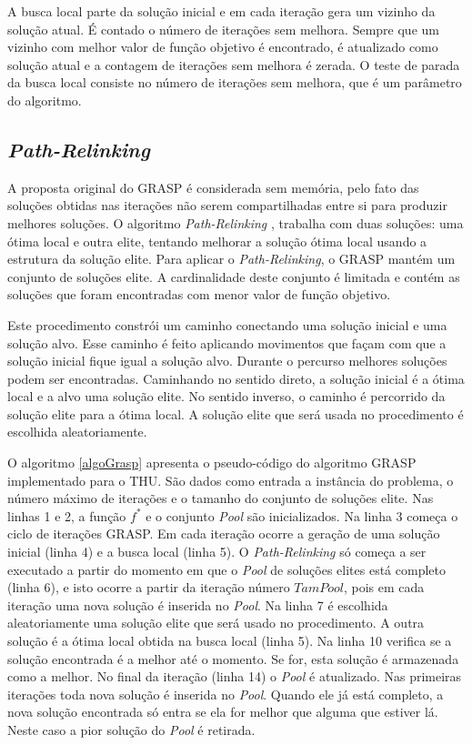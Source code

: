 \documentclass[11pt]{article}
\begin{document}
A busca local parte da solução inicial e em cada iteração gera um vizinho da solução atual. É contado o número de iterações sem melhora. Sempre que um vizinho com melhor valor de função objetivo é encontrado, é atualizado como solução atual e a contagem de iterações sem melhora é zerada. O teste de parada da busca local consiste no número de iterações sem melhora, que é um parâmetro do algoritmo. 

\subsection{\textit{Path-Relinking}}

A proposta original do GRASP é considerada sem memória, pelo fato das soluções obtidas nas iterações não serem compartilhadas entre si para produzir melhores soluções. O algoritmo \textit{Path-Relinking} \cite{Glover96tabusearch}, \cite{pathRelinking} trabalha com duas soluções: uma ótima local e outra elite, tentando melhorar a solução ótima local usando a estrutura da solução elite. Para aplicar o \textit{Path-Relinking}, o GRASP mantém um conjunto de soluções elite. A cardinalidade deste conjunto é limitada e contém as soluções que foram encontradas com menor valor de função objetivo.

Este procedimento constrói um caminho conectando uma solução inicial e uma solução alvo. Esse caminho é feito aplicando movimentos que façam com que a solução inicial fique igual a solução alvo. Durante o percurso melhores soluções podem ser encontradas. Caminhando no sentido direto, a solução inicial é a ótima local e a alvo uma solução elite. No sentido inverso, o caminho é percorrido da solução elite para a ótima local. A solução elite que será usada no procedimento é escolhida aleatoriamente.

O algoritmo \ref{algoGrasp} apresenta o pseudo-código do algoritmo GRASP implementado para o THU. São dados como entrada a instância do problema, o número máximo de iterações e o tamanho do conjunto de soluções elite. Nas linhas 1 e 2, a função $f^*$ e o conjunto \textit{Pool} são inicializados. Na linha 3 começa o ciclo de iterações GRASP. Em cada iteração ocorre a geração de uma solução inicial (linha 4) e a busca local (linha 5). O \textit{Path-Relinking} só começa a ser executado a partir do momento em que o \textit{Pool} de soluções elites está completo (linha 6), e isto ocorre a partir da iteração número $TamPool$, pois em cada iteração uma nova solução é inserida no \textit{Pool}. Na linha 7 é escolhida aleatoriamente uma solução elite que será usado no procedimento. A outra solução é a ótima local obtida na busca local (linha 5). Na linha 10 verifica se a solução encontrada é a melhor até o momento. Se for, esta solução é armazenada como a melhor. No final da iteração (linha 14) o \textit{Pool} é atualizado. Nas primeiras iterações toda nova solução é inserida no \textit{Pool}. Quando ele já está completo, a nova solução encontrada só entra se ela for melhor que alguma que estiver lá. Neste caso a pior solução do \textit{Pool} é retirada.
\end{document}
